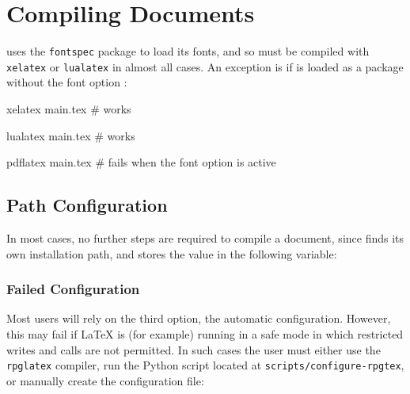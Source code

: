 	\section{Compiling \rpgtex{} Documents}

		\rpgtex{} uses the \texttt{fontspec} package to load its fonts, and so must be compiled with \texttt{xelatex} or \texttt{lualatex} in almost all cases. An exception is if \rpgtex{} is loaded as a package without the font option :
		\begin{Code}
			xelatex main.tex   \# works

			lualatex main.tex  \# works

			pdflatex main.tex  \# fails when the font option is active
		\end{Code}


		\subsection{Path Configuration} \label{S:Configuration}

			In most cases, no further steps are required to compile a document, since \rpgtex{} finds its own installation path, and stores the value in the following variable:


			\subsubsection{Failed Configuration}
				Most users will rely on the third option, the automatic configuration. However, this may fail if \LaTeX{} is (for example) running in a safe mode in which restricted writes and calls are not permitted. In such cases the user must either use the \texttt{rpglatex} compiler, run the Python script located at \texttt{scripts/configure-rpgtex}, or manually create the configuration file:

